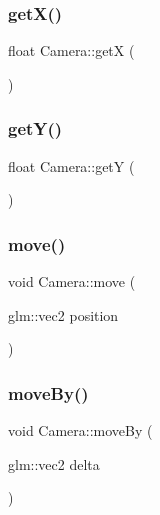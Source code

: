 \mbox{\label{class_camera_ae7c46d026313f6faefdcfdb5094ea8cb}} 
\subsubsection{\texorpdfstring{get\+X()}{getX()}}
{\footnotesize\ttfamily float Camera\+::getX (\begin{DoxyParamCaption}{ }\end{DoxyParamCaption})\hspace{0.3cm}{\ttfamily [inline]}}

\mbox{\label{class_camera_ad71d83315248602503546eba37697390}} 
\subsubsection{\texorpdfstring{get\+Y()}{getY()}}
{\footnotesize\ttfamily float Camera\+::getY (\begin{DoxyParamCaption}{ }\end{DoxyParamCaption})\hspace{0.3cm}{\ttfamily [inline]}}

\mbox{\label{class_camera_a3a9f789d49dc49569f0455157f5aa3b9}} 
\subsubsection{\texorpdfstring{move()}{move()}}
{\footnotesize\ttfamily void Camera\+::move (\begin{DoxyParamCaption}\item[{glm\+::vec2}]{position }\end{DoxyParamCaption})}

\mbox{\label{class_camera_abfa25e9a9791ab285b1c619c40c5bea7}} 
\subsubsection{\texorpdfstring{move\+By()}{moveBy()}}
{\footnotesize\ttfamily void Camera\+::move\+By (\begin{DoxyParamCaption}\item[{glm\+::vec2}]{delta }\end{DoxyParamCaption})}

